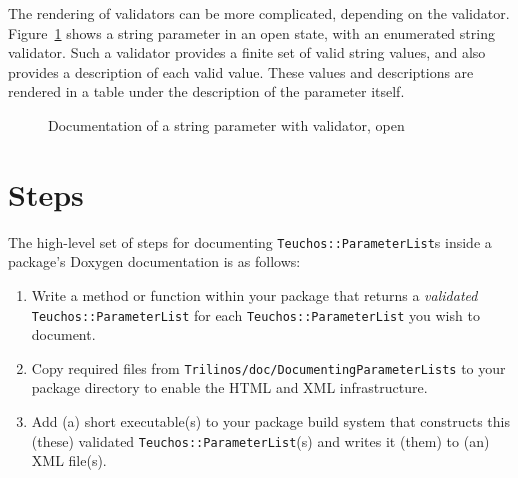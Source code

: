 \documentclass[pdf,ps2pdf,12pt]{smemo}
\begin{document}
\begin{memo}
The rendering of validators can be more complicated, depending on the
validator.  Figure~\ref{fig:open_string} shows a string parameter in
an open state, with an enumerated string validator. Such a validator
provides a finite set of valid string values, and also provides a
description of each valid value.  These values and descriptions are
rendered in a table under the description of the parameter itself.

\begin{figure}[h]
  \begin{centering}
    \caption{\label{fig:open_string} Documentation of a string
      parameter with validator, open}
  \end{centering}
\end{figure}

\section{Steps}
\label{sec:steps}

The high-level set of steps for documenting
\texttt{Teuchos::ParameterList}s inside a package's Doxygen
documentation is as follows:

\begin{enumerate}

\item Write a method or function within your package that returns a
  \emph{validated} \texttt{Teuchos::Pa\-ra\-me\-ter\-List} for each
  \texttt{Teuchos::ParameterList} you wish to document.

\item Copy required files from
  \texttt{Trilinos/doc/DocumentingParameterLists} to your package
  directory to enable the HTML and XML infrastructure.

\item Add (a) short executable(s) to your package build system that
  constructs this (these) validated \texttt{Teuchos::ParameterList}(s)
  and writes it (them) to (an) XML file(s).


\end{enumerate}
\end{memo}
\end{document}
